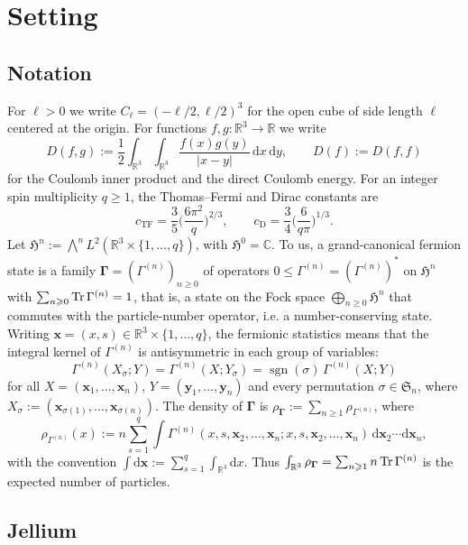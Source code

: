 \documentclass[final,reqno]{amsart}
\theoremstyle{remark}
\theoremstyle{definition}
\renewcommand{\le}{\leqslant}
\renewcommand{\ge}{\geqslant}
\newcommand{\RR}{\mathbb{R}}
\newcommand{\CC}{\mathbb{C}}
\newcommand{\TF}{\mathrm{TF}}
\newcommand{\Hil}{\mathfrak{H}}
\newcommand{\vGamma}{{\bm{\Gamma}}}
\begin{document}
\section{Setting}\label{sec:setting}

\subsection{Notation}\label{sec:notation}

For $\ell>0$ we write $C_\ell=(-\ell/2,\ell/2)^3$ for the open cube of side length $\ell$ centered at the origin. For functions $f,g:\RR^3\to\RR$  we write
\[
D(f,g):=\frac12\int_{\RR^3}\int_{\RR^3}\frac{f(x)g(y)}{|x-y|}\,\mathrm{d}x\,\mathrm{d}y,\qquad D(f):=D(f,f)
\]
for the Coulomb inner product and the direct Coulomb energy. For an integer spin multiplicity $q\ge1$, the Thomas--Fermi and Dirac constants are
\[
c_\TF=\frac35\Big(\frac{6\pi^2}{q}\Big)^{2/3},\qquad c_{\mathrm{D}}=\frac34\Big(\frac{6}{q\pi}\Big)^{1/3}.
\]
Let $\Hil^n:=\bigwedge^nL^2(\RR^3\times\{1,\dots,q\})$, with $\Hil^0=\CC$. To us, a grand-canonical fermion state is a family $\vGamma=(\Gamma^{(n)})_{n\ge0}$ of operators $0\le\Gamma^{(n)}=(\Gamma^{(n)})^*$ on $\Hil^n$ with $\sum_{n\ge0}\Tr\Gamma^{(n)}=1$, that is, a state on the Fock space $\bigoplus_{n\ge0}\Hil^n$ that commutes with the particle-number operator, i.e. a number-conserving state. Writing $\mathbf{x}=(x,s)\in\RR^3\times\{1,\dots,q\}$, the fermionic statistics means that the integral kernel of $\Gamma^{(n)}$ is antisymmetric in each group of variables:
\[
\Gamma^{(n)}(X_\sigma;Y)=\Gamma^{(n)}(X;Y_\sigma)=\operatorname{sgn}(\sigma)\,\Gamma^{(n)}(X;Y)
\]
for all $X=(\mathbf{x}_1,\dots,\mathbf{x}_n)$, $Y=(\mathbf{y}_1,\dots,\mathbf{y}_n)$ and every permutation $\sigma\in\mathfrak{S}_n$, where $X_\sigma:=(\mathbf{x}_{\sigma(1)},\dots,\mathbf{x}_{\sigma(n)})$. The density of $\vGamma$ is $\rho_{\vGamma}:=\sum_{n\ge1}\rho_{\Gamma^{(n)}}$, where
\[
\rho_{\Gamma^{(n)}}(x):=n\sum_{s=1}^q\int\Gamma^{(n)}(x,s,\mathbf{x}_2,\dots,\mathbf{x}_n;x,s,\mathbf{x}_2,\dots,\mathbf{x}_n)\,\mathrm{d}\mathbf{x}_2\cdots\mathrm{d}\mathbf{x}_n,
\]
with the convention $\int\mathrm{d}\mathbf{x}:=\sum_{s=1}^q\int_{\RR^3}\mathrm{d}x$. Thus $\int_{\RR^3}\rho_{\vGamma}=\sum_{n\ge1}n\Tr\Gamma^{(n)}$ is the expected number of particles.

\subsection{Jellium}\label{sec:LN}
\end{document}
